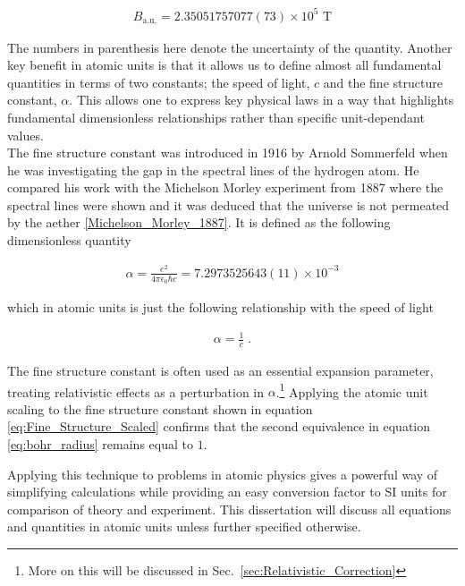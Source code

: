         \begin{align}
            B_{\text{a.u.}} = 2.35051757077(73) \times 10^5 \text{ T}
        \end{align}

        The numbers in parenthesis here denote the uncertainty of the quantity. Another key benefit in atomic units is that it allows us to define almost all fundamental quantities in terms of two constants; the speed of light, $c$ and the fine structure constant, $\alpha$. This allows one to express key physical laws in a way that highlights fundamental dimensionless relationships rather than specific unit-dependant values.\\

        The fine structure constant was introduced in 1916 by Arnold Sommerfeld when he was investigating the gap in the spectral lines of the hydrogen atom. He compared his work with the Michelson Morley experiment from 1887 where the spectral lines were shown and it was deduced that the universe is not permeated by the aether \ref{Michelson_Morley_1887}. It is defined as the following dimensionless quantity

        \begin{align}
            \alpha = \frac{e^2}{4\pi \epsilon_0 \hbar c} = 7.2973525643(11) \times 10^{-3}   
        \end{align}

        \noindent which in atomic units is just the following relationship with the speed of light 

        \begin{align}
            \alpha = \frac{1}{c} \label{eq:Fine_Structure_Scaled}\;.
        \end{align}

        \noindent The fine structure constant is often used as an essential expansion parameter, treating relativistic effects as a perturbation in $\alpha$.\footnote{More on this will be discussed in Sec.~\ref{sec:Relativistic_Correction}} Applying the atomic unit scaling to the fine structure constant shown in equation \eqref{eq:Fine_Structure_Scaled} confirms that the second equivalence in equation \eqref{eq:bohr_radius} remains equal to $1$. 

        Applying this technique to problems in atomic physics gives a powerful way of simplifying calculations while providing an easy conversion factor to SI units for comparison of theory and experiment. This dissertation will discuss all equations and quantities in atomic units unless further specified otherwise.


